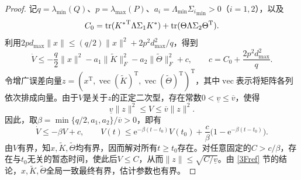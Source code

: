 \begin{proof}
    记$q=\lambda_{\min}(Q)$、$p=\lambda_{\max}(P)$、$a_i=\Lambda_{\mathrm{min}}{\Sigma_i}_{\mathrm{min}}>0$（$i=1,2$），以及
    \[
        C_0=\operatorname{tr}({K^*}^{\mathrm{T}}\Lambda\Sigma_1K^*)+\operatorname{tr}(\Theta\Lambda\Sigma_2\Theta^{\mathrm{T}}).
    \]
    利用$2pd_{\max}\|x\|\le(q/2)\|x\|^2+2p^2d_{\max}^2/q$，得到
    \[
        \dot V\le-\frac q2\|x\|^2-a_1\|\tilde K\|_F^2-a_2\|\tilde\Theta\|_F^2+c,\qquad
        c=C_0+\frac{2p^2d_{\max}^2}{q}.
    \]
    令增广误差向量$z=(x^{\mathrm{T}},\operatorname{vec}(\tilde K)^{\mathrm{T}},\operatorname{vec}(\tilde\Theta)^{\mathrm{T}})^{\mathrm{T}}$，其中$\operatorname{vec}$表示将矩阵各列依次排成向量。由于$V$是关于$z$的正定二次型，存在常数$0<\underline v\le\overline v$，使得
    \[
        \underline v\|z\|^2\le V\le\overline v\|z\|^2.
    \]
    因此，取$\beta=\min\{q/2,a_1,a_2\}/\overline v>0$，即有
    \[
        \dot V\le-\beta V+c,\qquad
        V(t)\le\mathrm{e}^{-\beta(t-t_0)}V(t_0)+\frac c\beta\bigl(1-\mathrm{e}^{-\beta(t-t_0)}\bigr).
    \]
    由$V$有界，知$x,\tilde K,\tilde\Theta$均有界，因而解对所有$t\ge t_0$存在。对任意固定的$C>c/\beta$，存在与$t_0$无关的暂态时间，使此后$V\le C$，从而$\|z\|\le\sqrt{C/\underline v}$。由 \ref{3Fref} 节的结论，$x,\tilde K,\tilde\Theta$全局一致最终有界，估计参数也有界。


\end{proof}

